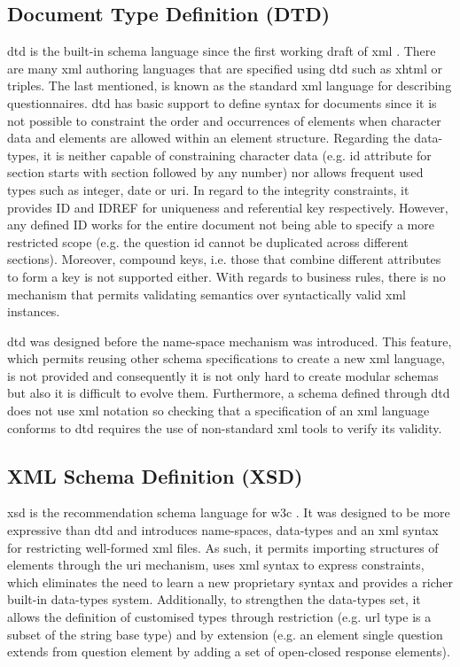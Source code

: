 	

	\subsection{Document Type Definition (DTD)}\label{sec:background:dtd}

	\gls{dtd} is the built-in schema language since the first working draft of \gls{xml} \cite{web:w3cdtd}. There are many \gls{xml} authoring languages that are specified using \gls{dtd} such as \gls{xhtml} or \gls{triples}. The last mentioned, is known as the standard \gls{xml} language for describing questionnaires. \gls{dtd} has basic support to define syntax for documents since it is not possible to constraint the order and occurrences of elements when character data and elements are allowed within an element structure. Regarding the data-types, it is neither capable of constraining character data (e.g. id attribute for section starts with section followed by any number) nor allows frequent used types such as integer, date or \gls{uri}. In regard to the integrity constraints, it provides ID and IDREF for uniqueness and referential key respectively. However, any defined ID works for the entire document not being able to specify a more restricted scope (e.g. the question id cannot be duplicated across different sections). Moreover, compound keys, i.e. those that combine different attributes to form a key is not supported either. With regards to business rules, there is no mechanism that permits validating semantics over syntactically valid \gls{xml} instances. 

	\gls{dtd} was designed before the name-space mechanism was introduced. This feature, which permits reusing other schema specifications to create a new \gls{xml} language, is not provided and consequently it is not only hard to create modular schemas but also it is difficult to evolve them. Furthermore, a schema defined through \gls{dtd} does not use \gls{xml} notation so checking that a specification of an \gls{xml} language conforms to \gls{dtd} requires the use of non-standard \gls{xml} tools to verify its validity.

	\subsection{XML Schema Definition (XSD)}\label{sec:background:xsd}
	\gls{xsd} is the recommendation schema language for \gls{w3c} \cite{web:w3cxsd}. It was designed to be more expressive than \gls{dtd} and introduces name-spaces, data-types and an \gls{xml} syntax for restricting well-formed \gls{xml} files. As such, it permits importing structures of elements through the \gls{uri} mechanism, uses \gls{xml} syntax to express constraints, which eliminates the need to learn a new proprietary syntax and provides a richer built-in data-types system. Additionally, to strengthen the data-types set, it allows the definition of customised types through restriction (e.g. \gls{url} type is a subset of the string base type) and by extension (e.g. an element single question extends from question element by adding a set of open-closed response elements).


